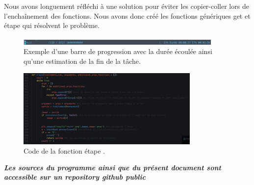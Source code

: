 \documentclass[hidelinks,11pt]{article}
\theoremstyle{mytheoremstyle}
\theoremstyle{mytheoremstyle}
\theoremstyle{myproblemstyle}
\begin{document}
    Nous avons longuement réfléchi à une solution pour éviter les copier-coller lors de l’enchaînement des fonctions. 
    Nous avons donc créé les fonctions génériques get et étape qui résolvent le problème.

    \begin{figure}[h]
        \centering
        \includegraphics[width=0.9\textwidth]{figs/fig12}
        \caption{Exemple d'une barre de progression avec la durée écoulée ainsi qu'une estimation de la fin de la tâche.}
    \end{figure}

    \begin{figure}[h]
        \centering
        \includegraphics[width=0.8\textwidth]{figs/fig13}
        \caption{Code de la fonction étape \cite{git-etape} .}
    \end{figure}

    
    
    \textit{\textbf{Les sources du programme ainsi que du présent document sont accessible sur un repository github public \cite{git}}}
\end{document}
